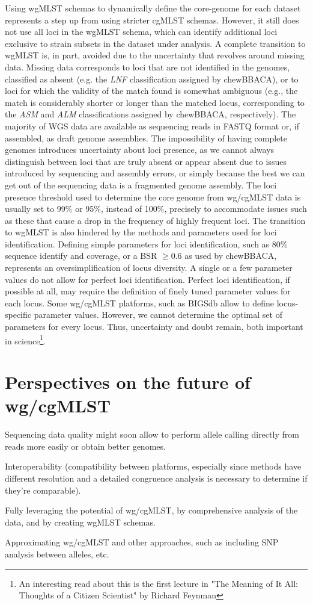 Using wgMLST schemas to dynamically define the core-genome for each dataset represents a step up from using stricter cgMLST schemas. However, it still does not use all loci in the wgMLST schema, which can identify additional loci exclusive to strain subsets in the dataset under analysis. A complete transition to wgMLST is, in part, avoided due to the uncertainty that revolves around missing data. Missing data corresponds to loci that are not identified in the genomes, classified as absent (e.g. the \textit{LNF} classification assigned by chewBBACA), or to loci for which the validity of the match found is somewhat ambiguous (e.g., the match is considerably shorter or longer than the matched locus, corresponding to the \textit{ASM} and \textit{ALM} classifications assigned by chewBBACA, respectively). The majority of WGS data are available as sequencing reads in FASTQ format or, if assembled, as draft genome assemblies. The impossibility of having complete genomes introduces uncertainty about loci presence, as we cannot always distinguish between loci that are truly absent or appear absent due to issues introduced by sequencing and assembly errors, or simply because the best we can get out of the sequencing data is a fragmented genome assembly. The loci presence threshold used to determine the core genome from \ac{wg/cgMLST} data is usually set to 99\% or 95\%, instead of 100\%, precisely to accommodate issues such as these that cause a drop in the frequency of highly frequent loci.
The transition to wgMLST is also hindered by the methods and parameters used for loci identification. Defining simple parameters for loci identification, such as 80\% sequence identify and coverage, or a BSR $\geq0.6$ as used by chewBBACA, represents an oversimplification of locus diversity. A single or a few parameter values do not allow for perfect loci identification. Perfect loci identification, if possible at all, may require the definition of finely tuned parameter values for each locus. Some wg/cgMLST platforms, such as BIGSdb allow to define locus-specific parameter values. However, we cannot determine the optimal set of parameters for every locus. Thus, uncertainty and doubt remain, both important in science\footnote{An interesting read about this is the first lecture in "The Meaning of It All: Thoughts of a Citizen Scientist" by Richard Feynman}.

\section{Perspectives on the future of wg/cgMLST}




Sequencing data quality might soon allow to perform allele calling directly from reads more easily or obtain better genomes.

Interoperability (compatibility between platforms, especially since methods have different resolution and a detailed congruence analysis is necessary to determine if they're comparable).

Fully leveraging the potential of wg/cgMLST, by comprehensive analysis of the data, and by creating wgMLST schemas.

Approximating wg/cgMLST and other approaches, such as including SNP analysis between alleles, etc.
